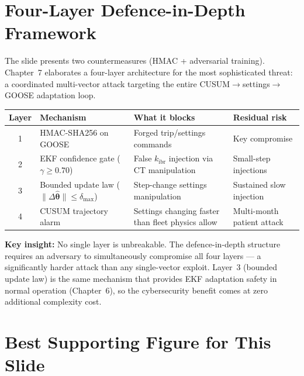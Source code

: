 \documentclass[12pt,a4paper]{article}
\newcommand{\kibr}{k_\mathrm{ibr}}
\begin{document}
\section{Four-Layer Defence-in-Depth Framework}

The slide presents two countermeasures (HMAC + adversarial training). Chapter~7 elaborates a four-layer architecture for the most sophisticated threat: a coordinated multi-vector attack targeting the entire CUSUM$\to$settings$\to$GOOSE adaptation loop.

\begin{center}
\begin{tabular}{@{}clp{6cm}p{4cm}@{}}
\toprule
\textbf{Layer} & \textbf{Mechanism} & \textbf{What it blocks} & \textbf{Residual risk} \\
\midrule
1 & HMAC-SHA256 on GOOSE & Forged trip/settings commands & Key compromise \\
2 & EKF confidence gate ($\gamma \geq 0.70$) & False $\kibr$ injection via CT manipulation & Small-step injections \\
3 & Bounded update law ($\|\Delta\hat{\bm{\theta}}\| \leq \delta_\mathrm{max}$) & Step-change settings manipulation & Sustained slow injection \\
4 & CUSUM trajectory alarm & Settings changing faster than fleet physics allow & Multi-month patient attack \\
\bottomrule
\end{tabular}
\end{center}

\textbf{Key insight:} No single layer is unbreakable. The defence-in-depth structure requires an adversary to simultaneously compromise all four layers — a significantly harder attack than any single-vector exploit. Layer~3 (bounded update law) is the same mechanism that provides EKF adaptation safety in normal operation (Chapter~6), so the cybersecurity benefit comes at zero additional complexity cost.

\section{Best Supporting Figure for This Slide}
\end{document}

